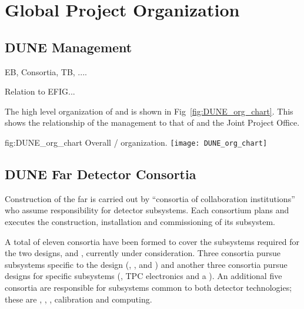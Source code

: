 \chapter{Global Project Organization}
\label{vl:tc-global}


\section{DUNE Management}
\label{sec:dune_management}

EB, Consortia, TB, ....

Relation to EFIG...

The high level organization of  and  is shown
in Fig~\ref{fig:DUNE_org_chart}. This shows the relationship of the
 management to that of  and the Joint Project
Office.
\begin{dunefigure}{fig:DUNE_org_chart}
  {Overall / organization.}
  \texttt{[image: DUNE\_org\_chart]}
\end{dunefigure}

\section{DUNE Far Detector Consortia}
\label{sec:consortia}


Construction of the  far  is carried out by
``consortia of collaboration institutions'' who assume responsibility
for detector subsystems.  Each consortium plans and
executes the construction, installation and commissioning of its 
subsystem.


A total of eleven  consortia have been formed to cover the
subsystems required for the two  designs,  and
, currently under consideration.  Three consortia pursue
subsystems specific to the  design (, ,
and ) and another three consortia pursue designs for
 specific subsystems (, TPC electronics and a
 ).  An additional five consortia are responsible
for subsystems common to both detector technologies; these are
, , , calibration and computing.



